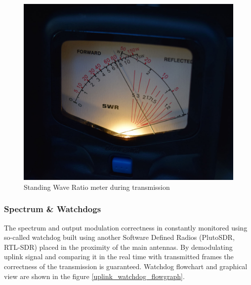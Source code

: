 \begin{figure}
    \centering
    \includegraphics[width=0.6\paperwidth]{img/5/swr_meter_photo.jpg}
    \caption{Standing Wave Ratio meter during transmission}
    \label{swr_meter_photo}
\end{figure}



\subsubsection{Spectrum \& Watchdogs}
The spectrum and output modulation correctness in constantly monitored using so-called watchdog built using another Software Defined Radios (PlutoSDR, RTL-SDR) placed in the proximity of the main antennas.
By demodulating uplink signal and comparing it in the real time with transmitted frames the correctness of the transmission is guaranteed. Watchdog flowchart and graphical view are shown in the figure \ref{uplink_watchdog_flowgraph}.

